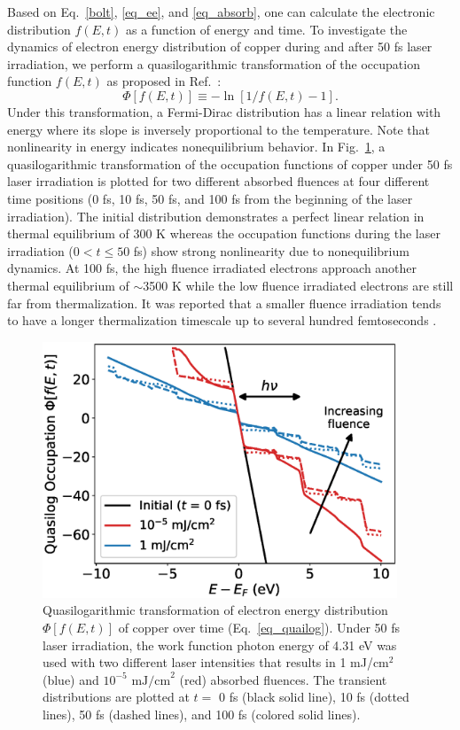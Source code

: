 Based on Eq.~\ref{bolt}, \ref{eq_ee}, and \ref{eq_absorb}, one can calculate the electronic distribution $f(E,t)$ as a function of energy and time.
To investigate the dynamics of electron energy distribution of copper during and after 50 fs laser irradiation, we perform a quasilogarithmic transformation of the occupation function $f(E,t)$ as proposed in Ref.~\cite{skin}:
\begin{equation} \label{eq_quailog}
	\Phi[f(E,t)] \equiv -\ln[1/f(E,t)-1].
\end{equation}
Under this transformation, a Fermi-Dirac distribution has a linear relation with energy where its slope is inversely proportional to the temperature. Note that nonlinearity in energy indicates nonequilibrium behavior. In Fig.~\ref{fig_occupation}, a quasilogarithmic transformation of the occupation functions of copper under 50 fs laser irradiation is plotted for two different absorbed fluences at four different time positions (0 fs, 10 fs, 50 fs, and 100 fs from the beginning of the laser irradiation). The initial distribution demonstrates a perfect linear relation in thermal equilibrium of 300 K whereas the occupation functions during the laser irradiation ($0<t \leq 50$ fs) show strong nonlinearity due to nonequilibrium dynamics. At 100 fs, the high fluence irradiated electrons approach another thermal equilibrium of $\sim$3500 K while the low fluence irradiated electrons are still far from thermalization. It was reported that a smaller fluence irradiation tends to have a longer thermalization timescale up to several hundred femtoseconds \cite{boltzmann}.

\begin{figure}
	\centering
	\includegraphics*[width=300pt]{figs/boltzmann/occupation.eps}
	\caption{Quasilogarithmic transformation of electron energy distribution $\Phi[f(E,t)]$ of copper over time (Eq.~\ref{eq_quailog}).  Under 50 fs laser irradiation, the work function photon energy of 4.31 eV was used with two different laser intensities that results in 1 mJ/cm$^2$ (blue) and $10^{-5} \textrm{ mJ/cm}^2$ (red) absorbed fluences. The transient distributions are plotted at $t=$ 0 fs (black solid line), 10 fs (dotted lines), 50 fs (dashed lines), and 100 fs (colored solid lines).}
	\label{fig_occupation}
\end{figure}

